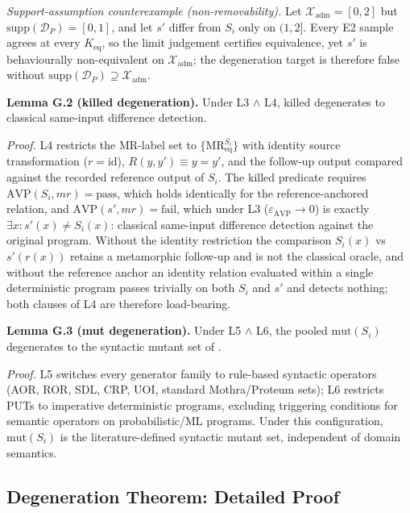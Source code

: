 \documentclass[review,12pt,authoryear]{elsarticle}
\begin{document}
\emph{Support-assumption counterexample (non-removability).} Let
$\mathcal{X}_{\mathrm{adm}} = [0, 2]$ but
$\mathrm{supp}(\mathcal{D}_P) = [0, 1]$, and let $s'$ differ from $S_i$
only on $(1, 2]$. Every E2 sample agrees at every $K_{\mathrm{eq}}$, so
the limit judgement certifies equivalence, yet $s'$ is behaviourally
non-equivalent on $\mathcal{X}_{\mathrm{adm}}$; the degeneration target
is therefore false without
$\mathrm{supp}(\mathcal{D}_P) \supseteq \mathcal{X}_{\mathrm{adm}}$.

\textbf{Lemma G.2 (killed degeneration).} Under L3 $\wedge$ L4, killed
degenerates to classical same-input difference detection.

\emph{Proof.} L4 restricts the MR-label set to
$\{\mathrm{MR}_{\mathrm{eq}}^{S_i}\}$ with identity source
transformation ($r = \mathrm{id}$), $R(y, y') \equiv y = y'$, and the
follow-up output compared against the recorded reference output of
$S_i$. The killed predicate requires
$\mathrm{AVP}(S_i, mr) = \text{pass}$, which holds identically for the
reference-anchored relation, and $\mathrm{AVP}(s', mr) = \text{fail}$,
which under L3 ($\varepsilon_{\mathrm{AVP}} \to 0$) is exactly
$\exists x: s'(x) \neq S_i(x)$: classical same-input difference
detection against the original program. Without the identity
restriction the comparison $S_i(x)$ vs $s'(r(x))$ retains a metamorphic
follow-up and is not the classical oracle, and without the reference
anchor an identity relation evaluated within a single deterministic
program passes trivially on both $S_i$ and $s'$ and detects nothing;
both clauses of L4 are therefore load-bearing.

\textbf{Lemma G.3 (mut degeneration).} Under L5 $\wedge$ L6, the pooled
$\mathrm{mut}(S_i)$
degenerates to the syntactic mutant set of \citet{d7c38286734419b52de4262c9802ebdfcf4b9447}.

\emph{Proof.} L5 switches every generator family to rule-based syntactic operators (AOR,
ROR, SDL, CRP, UOI, standard Mothra/Proteum sets); L6 restricts PUTs
to imperative deterministic programs, excluding triggering conditions
for semantic operators on probabilistic/ML programs. Under this
configuration, $\mathrm{mut}(S_i)$ is the literature-defined syntactic mutant
set, independent of domain semantics.

\subsection{Degeneration Theorem: Detailed Proof}\label{g.4-theorem-9.1-detailed-proof}
\end{document}
